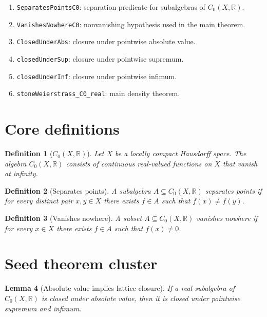 \documentclass[11pt]{article}
\newtheorem{definition}{Definition}[section]
\newtheorem{lemma}[definition]{Lemma}
\begin{document}
\begin{enumerate}
\item \texttt{SeparatesPointsC0}: separation predicate for subalgebras of
$C_0(X,\mathbb{R})$.
\item \texttt{VanishesNowhereC0}: nonvanishing hypothesis used in the main
theorem.
\item \texttt{ClosedUnderAbs}: closure under pointwise absolute value.
\item \texttt{closedUnderSup}: closure under pointwise supremum.
\item \texttt{closedUnderInf}: closure under pointwise infimum.
\item \texttt{stoneWeierstrass\_C0\_real}: main density theorem.
\end{enumerate}

\section{Core definitions}

\begin{definition}[$C_0(X,\mathbb{R})$]\label{def:c0-space}
Let $X$ be a locally compact Hausdorff space. The algebra $C_0(X, \mathbb{R})$
consists of continuous real-valued functions on $X$ that vanish at infinity.
\end{definition}

\begin{definition}[Separates points]\label{def:separates-points}
A subalgebra $A \subseteq C_0(X, \mathbb{R})$ separates points if for every
distinct pair $x,y \in X$ there exists $f \in A$ such that $f(x) \neq f(y)$.
\end{definition}

\begin{definition}[Vanishes nowhere]\label{def:vanishes-nowhere}
A subset $A \subseteq C_0(X, \mathbb{R})$ vanishes nowhere if for every
$x \in X$ there exists $f \in A$ such that $f(x) \neq 0$.
\end{definition}

\section{Seed theorem cluster}

\begin{lemma}[Absolute value implies lattice closure]
\label{lem:absolute-value-implies-lattice-closure}
If a real subalgebra of $C_0(X, \mathbb{R})$ is closed under absolute value,
then it is closed under pointwise supremum and infimum.
\end{lemma}
\end{document}
